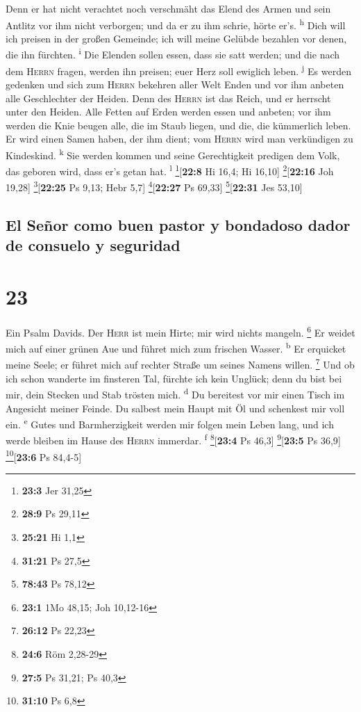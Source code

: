  Denn er hat nicht verachtet noch verschmäht das Elend
des Armen und sein Antlitz vor ihm nicht verborgen; und da er zu ihm
schrie, hörte er's. \textsuperscript{h}  Dich will ich
preisen in der großen Gemeinde; ich will meine Gelübde bezahlen vor
denen, die ihn fürchten. \textsuperscript{i}  Die Elenden
sollen essen, dass sie satt werden; und die nach dem \textsc{Herrn}
fragen, werden ihn preisen; euer Herz soll ewiglich leben.
\textsuperscript{j}  Es werden gedenken und sich zum
\textsc{Herrn} bekehren aller Welt Enden und vor ihm anbeten alle
Geschlechter der Heiden.  Denn des \textsc{Herrn} ist das
Reich, und er herrscht unter den Heiden.  Alle Fetten auf
Erden werden essen und anbeten; vor ihm werden die Knie beugen alle, die
im Staub liegen, und die, die kümmerlich leben.  Er wird
einen Samen haben, der ihm dient; vom \textsc{Herrn} wird man
verkündigen zu Kindeskind. \textsuperscript{k}  Sie
werden kommen und seine Gerechtigkeit predigen dem Volk, das geboren
wird, dass er's getan hat. \textsuperscript{l}
\footnote{\textbf{23:3} Jer 31,25}{[}\textbf{22:8} Hi 16,4; Hi 16,10{]}
\footnote{\textbf{28:9} Ps 29,11}{[}\textbf{22:16} Joh 19,28{]}
\footnote{\textbf{25:21} Hi 1,1}{[}\textbf{22:25} Ps 9,13; Hebr 5,7{]}
\footnote{\textbf{31:21} Ps 27,5}{[}\textbf{22:27} Ps 69,33{]}
\footnote{\textbf{78:43} Ps 78,12}{[}\textbf{22:31} Jes 53,10{]}

\hypertarget{el-seuxf1or-como-buen-pastor-y-bondadoso-dador-de-consuelo-y-seguridad}{%
\subsection{El Señor como buen pastor y bondadoso dador de consuelo y
seguridad}\label{el-seuxf1or-como-buen-pastor-y-bondadoso-dador-de-consuelo-y-seguridad}}

\hypertarget{section-22}{%
\section{23}\label{section-22}}

 Ein Psalm Davids. Der \textsc{Herr} ist mein Hirte; mir
wird nichts mangeln. \footnote{\textbf{23:1} 1Mo 48,15; Joh 10,12-16}
 Er weidet mich auf einer grünen Aue und führet mich zum
frischen Wasser. \textsuperscript{b}  Er erquicket meine
Seele; er führet mich auf rechter Straße um seines Namens willen.
\footnote{\textbf{26:12} Ps 22,23}  Und ob ich schon
wanderte im finsteren Tal, fürchte ich kein Unglück; denn du bist bei
mir, dein Stecken und Stab trösten mich. \textsuperscript{d}
 Du bereitest vor mir einen Tisch im Angesicht meiner
Feinde. Du salbest mein Haupt mit Öl und schenkest mir voll ein.
\textsuperscript{e}  Gutes und Barmherzigkeit werden mir
folgen mein Leben lang, und ich werde bleiben im Hause des
\textsc{Herrn} immerdar. \textsuperscript{f} \footnote{\textbf{24:6} Röm
  2,28-29}{[}\textbf{23:4} Ps 46,3{]} \footnote{\textbf{27:5} Ps 31,21;
  Ps 40,3}{[}\textbf{23:5} Ps 36,9{]} \footnote{\textbf{31:10} Ps 6,8}{[}\textbf{23:6}
Ps 84,4-5{]}

